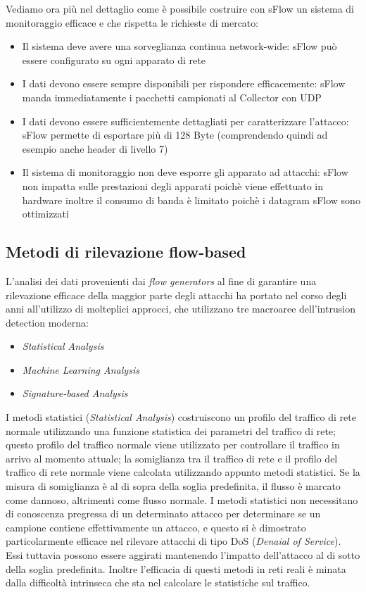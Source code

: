 \documentclass[12pt,a4paper,openright,twoside]{report}
\begin{document}
Vediamo ora pi\`u nel dettaglio come \`e possibile costruire con sFlow un sistema di monitoraggio efficace
e che rispetta le richieste di mercato:
\begin{itemize}
  \item Il sistema deve avere una sorveglianza continua network-wide: sFlow pu\`o essere configurato su ogni apparato di rete
  \item I dati devono essere sempre disponibili per rispondere efficacemente: sFlow manda immediatamente
  i pacchetti campionati al Collector con UDP
  \item I dati devono essere sufficientemente dettagliati per caratterizzare l'attacco: sFlow permette di
  esportare pi\`u di 128 Byte (comprendendo quindi ad esempio anche header di livello 7)
  \item Il sistema di monitoraggio non deve esporre gli apparato ad attacchi: sFlow non impatta sulle
  prestazioni degli apparati poich\`e viene effettuato in hardware inoltre il consumo di banda \`e limitato
  poich\`e i datagram sFlow sono ottimizzati
\end{itemize}

\subsection{Metodi di rilevazione flow-based}

L'analisi dei dati provenienti dai {\it flow generators} al fine di garantire una
rilevazione efficace della maggior parte degli attacchi ha portato nel corso degli anni
all'utilizzo di molteplici approcci, che utilizzano tre macroaree dell'intrusion
detection moderna:
\begin{itemize}
  \item {\it Statistical Analysis}
  \item {\it Machine Learning Analysis}
  \item {\it Signature-based Analysis}
\end{itemize}


I metodi statistici ({\it Statistical Analysis}) costruiscono un profilo del traffico
di rete normale utilizzando una funzione statistica dei parametri del traffico di rete;
questo profilo del traffico normale viene utilizzato per controllare il traffico in
arrivo al momento attuale; la somiglianza tra il traffico di rete e il profilo del
traffico di rete normale viene calcolata utilizzando appunto metodi statistici. Se la misura
di somiglianza \`e al di sopra della soglia predefinita, il flusso \`e marcato come
dannoso, altrimenti come flusso normale. \cite{S4} I metodi statistici non necessitano di conoscenza pregressa
di un determinato attacco per determinare se un campione contiene effettivamente un attacco, e questo si
\`e dimostrato particolarmente efficace nel rilevare attacchi di tipo DoS ({\it Denaial of
Service}). Essi tuttavia possono essere aggirati mantenendo l'impatto dell'attacco al di
sotto della soglia predefinita. Inoltre l'efficacia di questi metodi in reti reali
\`e minata dalla difficolt\`a intrinseca che sta nel calcolare le statistiche sul traffico.
\end{document}
